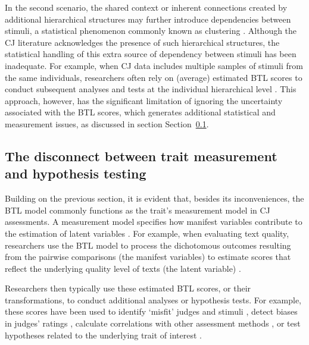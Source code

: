 \documentclass[
  authoryear,
  preprint,
  1p]{elsarticle}
\begin{document}
In the second scenario, the shared context or inherent connections
created by additional hierarchical structures may further introduce
dependencies between stimuli, a statistical phenomenon commonly known as
clustering \citep{Everitt_et_al_2010}. Although the CJ literature
acknowledges the presence of such hierarchical structures, the
statistical handling of this extra source of dependency between stimuli
has been inadequate. For example, when CJ data includes multiple samples
of stimuli from the same individuals, researchers often rely on
(average) estimated BTL scores to conduct subsequent analyses and tests
at the individual hierarchical level
\citep{Bramley_et_al_2019, Boonen_et_al_2020, Bouwer_et_al_2023, vanDaal_et_al_2017, Jones_et_al_2019, Gijsen_et_al_2021}.
This approach, however, has the significant limitation of ignoring the
uncertainty associated with the BTL scores, which generates additional
statistical and measurement issues, as discussed in section
Section~\ref{sec-theory-issue2}.

\subsection{The disconnect between trait measurement and hypothesis
testing}\label{sec-theory-issue2}

Building on the previous section, it is evident that, besides its
inconveniences, the BTL model commonly functions as the trait's
measurement model in CJ assessments. A measurement model specifies how
manifest variables contribute to the estimation of latent variables
\citep{Everitt_et_al_2010}. For example, when evaluating text quality,
researchers use the BTL model to process the dichotomous outcomes
resulting from the pairwise comparisons (the manifest variables) to
estimate scores that reflect the underlying quality level of texts (the
latent variable)
\citep{Laming_2004, Pollitt_2012b, Whitehouse_2012, vanDaal_et_al_2016, Lesterhuis_2018_thesis, Coertjens_et_al_2017, Goossens_et_al_2018, Bouwer_et_al_2023}.

Researchers then typically use these estimated BTL scores, or their
transformations, to conduct additional analyses or hypothesis tests. For
example, these scores have been used to identify `misfit' judges and
stimuli \citep{Pollitt_2012b, vanDaal_et_al_2016, Goossens_et_al_2018},
detect biases in judges' ratings
\citep{Pollitt_et_al_2003, Pollitt_2012b}, calculate correlations with
other assessment methods \citep{Goossens_et_al_2018, Bouwer_et_al_2023},
or test hypotheses related to the underlying trait of interest
\citep{Bramley_et_al_2019, Boonen_et_al_2020, Bouwer_et_al_2023, vanDaal_et_al_2017, Jones_et_al_2019, Gijsen_et_al_2021}.
\end{document}

